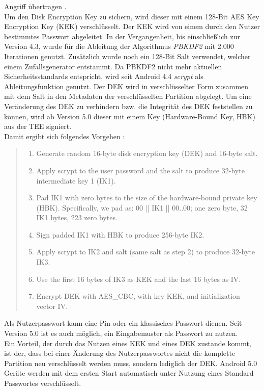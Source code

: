 	Angriff übertragen \cite{Jakob}.\\
	Um den Disk Encryption Key zu sichern, wird dieser mit einem 128-Bit AES Key
	Encryption Key (KEK) verschlüsselt. Der KEK wird von einem durch den Nutzer
	bestimmtes Passwort abgeleitet. In der Vergangenheit, bis einschließlich zur
	Version 4.3, wurde für die Ableitung der Algorithmus \textit{PBKDF2} mit 2.000
	Iterationen genutzt. Zusätzlich wurde noch ein 128-Bit Salt verwendet, welcher
	einem Zufallsgenerator entstammt. Da PBKDF2 nicht mehr aktuellen
	Sicherheitsstandards entspricht, wird seit Android 4.4 \textit{scrypt} als
	Ableitungsfunktion genutzt. Der DEK wird in verschlüsselter Form zusammen mit
	dem Salt in den Metadaten der verschlüsselten Partition abgelegt. Um eine
	Veränderung des DEK zu verhindern bzw. die Integrität des DEK feststellen zu
	können, wird ab Version 5.0 dieser mit einem Key (Hardware-Bound Key, HBK) aus
	der TEE signiert. \\
	Damit ergibt sich folgendes Vorgehen \cite{AndroidCrypt}:
	\begin{quote}
		\begin{enumerate}
		   \item Generate random 16-byte disk encryption key (DEK) and 16-byte salt.
		   \item Apply scrypt to the user password and the salt to produce 32-byte intermediate key 1 (IK1).
		   \item Pad IK1 with zero bytes to the size of the hardware-bound private key (HBK). Specifically, we pad as: 00 || IK1 || 00..00; one zero byte, 32 IK1 bytes, 223 zero bytes.
		   \item Sign padded IK1 with HBK to produce 256-byte IK2.
		   \item Apply scrypt to IK2 and salt (same salt as step 2) to produce 32-byte IK3.
		   \item Use the first 16 bytes of IK3 as KEK and the last 16 bytes as IV.
		   \item Encrypt DEK with AES\_CBC, with key KEK, and initialization vector IV. 
	   \end{enumerate}
	\end{quote}
	Als Nutzerpasswort kann eine Pin oder ein klassisches Passwort dienen. Seit
	Version 5.0 ist es auch möglich, ein Eingabemuster als Passwort zu nutzen.\\
	Ein Vorteil, der durch das Nutzen eines KEK und eines DEK zustande kommt, ist
	der, dass bei einer Änderung des Nutzerpasswortes nicht die komplette
	Partition neu verschlüsselt werden muss, sondern lediglich der DEK. Android
	5.0 Geräte werden mit dem ersten Start automatisch unter Nutzung eines
	Standard Passwortes verschlüsselt.
	
